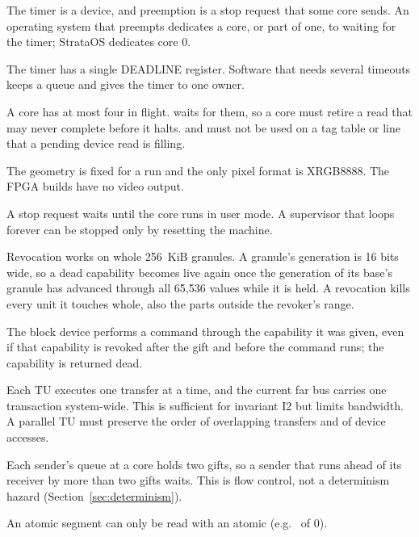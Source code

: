 \begin{description}[leftmargin=1em,style=nextline]
\item[No timer interrupt] The timer is a device, and preemption is a stop request that some core
  sends. An operating system that preempts dedicates a core, or part of one, to waiting for the timer;
  StrataOS dedicates core 0.
\item[One deadline] The timer has a single DEADLINE register. Software that needs several timeouts
  keeps a queue and gives the timer to one owner.
\item[Pending device reads] A core has at most four in flight.  waits for them, so a core
  must retire a read that may never complete before it halts.  and  must not be
  used on a tag table or line that a pending device read is filling.
\item[Display] The geometry is fixed for a run and the only pixel format is XRGB8888. The FPGA builds
  have no video output.
\item[Supervisor code is never preempted] A stop request waits until the core runs in user mode. A
  supervisor that loops forever can be stopped only by resetting the machine.
\item[Revocation limits] Revocation works on whole 256~KiB granules. A granule's generation is 16
  bits wide, so a dead capability becomes live again once the generation of its base's granule has
  advanced through all 65,536 values while it is held. A revocation kills every unit it touches whole,
  also the parts outside the revoker's range.
\item[Block device and revocation] The block device performs a command through the capability it was
  given, even if that capability is revoked after the gift and before the command runs; the
  capability is returned dead.
\item[Serial Transfer Unit and bus] Each TU executes one transfer at a time, and the current far bus
  carries one transaction system-wide. This is sufficient for invariant I2 but limits bandwidth. A
  parallel TU must preserve the order of overlapping transfers and of device accesses.
\item[Inbox capacity] Each sender's queue at a core holds two gifts, so a sender that runs ahead of
  its receiver by more than two gifts waits. This is flow control, not a determinism hazard
  (Section~\ref{sec:determinism}).
\item[Atomic reads] An atomic segment can only be read with an atomic (e.g.\  of 0).

\end{description}
